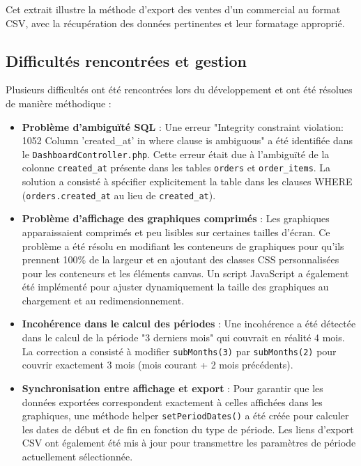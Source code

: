\documentclass[a4paper,12pt]{report}
\begin{document}
  Cet extrait illustre la méthode d'export des ventes d'un commercial au format CSV, avec la récupération des données pertinentes et leur formatage approprié.

  \subsection{Difficultés rencontrées et gestion}
  Plusieurs difficultés ont été rencontrées lors du développement et ont été résolues de manière méthodique :
  
  \begin{itemize}
    \item \textbf{Problème d'ambiguïté SQL} : Une erreur "Integrity constraint violation: 1052 Column 'created\_at' in where clause is ambiguous" a été identifiée dans le \texttt{DashboardController.php}. Cette erreur était due à l'ambiguïté de la colonne \texttt{created\_at} présente dans les tables \texttt{orders} et \texttt{order\_items}. La solution a consisté à spécifier explicitement la table dans les clauses WHERE (\texttt{orders.created\_at} au lieu de \texttt{created\_at}).
    
    \item \textbf{Problème d'affichage des graphiques comprimés} : Les graphiques apparaissaient comprimés et peu lisibles sur certaines tailles d'écran. Ce problème a été résolu en modifiant les conteneurs de graphiques pour qu'ils prennent 100\% de la largeur et en ajoutant des classes CSS personnalisées pour les conteneurs et les éléments canvas. Un script JavaScript a également été implémenté pour ajuster dynamiquement la taille des graphiques au chargement et au redimensionnement.
    
    \item \textbf{Incohérence dans le calcul des périodes} : Une incohérence a été détectée dans le calcul de la période "3 derniers mois" qui couvrait en réalité 4 mois. La correction a consisté à modifier \texttt{subMonths(3)} par \texttt{subMonths(2)} pour couvrir exactement 3 mois (mois courant + 2 mois précédents).
    
    \item \textbf{Synchronisation entre affichage et export} : Pour garantir que les données exportées correspondent exactement à celles affichées dans les graphiques, une méthode helper \texttt{setPeriodDates()} a été créée pour calculer les dates de début et de fin en fonction du type de période. Les liens d'export CSV ont également été mis à jour pour transmettre les paramètres de période actuellement sélectionnée.
  \end{itemize}
\end{document}
